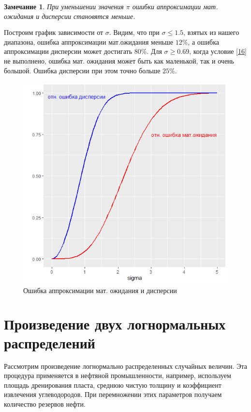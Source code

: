 \documentclass[12pt]{article}
\newtheorem{zam}{Замечание}
\begin{document}
\begin{zam}
	При уменьшении значения $\pi$ ошибки аппроксимации мат. ожидания и дисперсии становятся меньше.
\end{zam}
	
	Построим график зависимости от $\sigma$. Видим, что при $\sigma\leq1.5$, взятых из нашего диапазона, ошибка аппроксимации мат.ожидания меньше $12\%$, а ошибка аппроксимации дисперсии может достигать $80\%$. Для $\sigma\geq 0.69$, когда условие \eqref{16} не выполнено, ошибка мат. ожидания может быть как маленькой, так и очень большой. Ошибка дисперсии при этом точно больше $25\%$.
	
	\begin{figure}[h]
		\begin{center}
			\begin{minipage}[h]{0.6\linewidth}
				\includegraphics[width=1\linewidth]{img/par_new2.jpg}
				\caption{Ошибка аппроксимации мат. ожидания и дисперсии} %
				\label{ris:image1} %
			\end{minipage}
			
		\end{center}
	\end{figure}
	
	\section{Произведение двух логнормальных распределений}
	Рассмотрим произведение логнормально распределенных случайных величин. Эта процедура применяется в нефтяной промышленности, например, используем площадь дренирования пласта, среднюю чистую толщину и коэффициент извлечения углеводородов. При перемножении этих параметров получаем количество резервов нефти.
	
\end{document}
